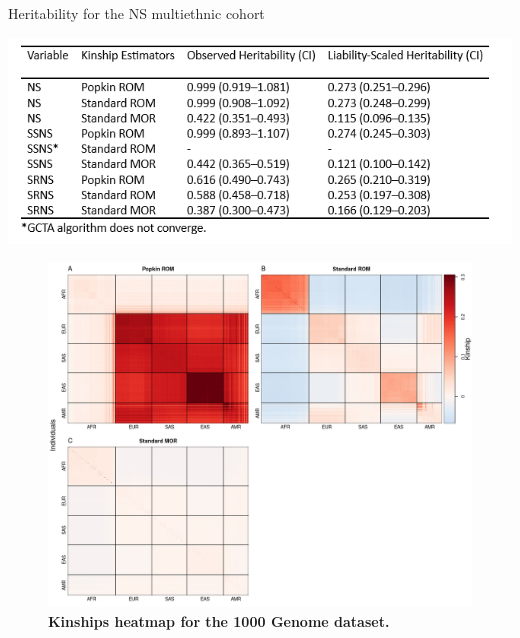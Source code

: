 \documentclass[11pt]{article}
\begin{document}
\begin{table}[h]
  \caption{Heritability for the NS multiethnic cohort}
  \label{tbl:NS_herit_table}
  \includegraphics[width=\linewidth]{data/S_table_1_NS_herit.PNG}
\end{table}

\begin{figure}[bp!]
  \centering
  \includegraphics[width=\textwidth]{data/SFig_TGP_kinships.png}
  \caption{
    {\bf Kinships heatmap for the 1000 Genome dataset.}
    }
  \label{fig:TGP_kinships}
\end{figure}
\end{document}
